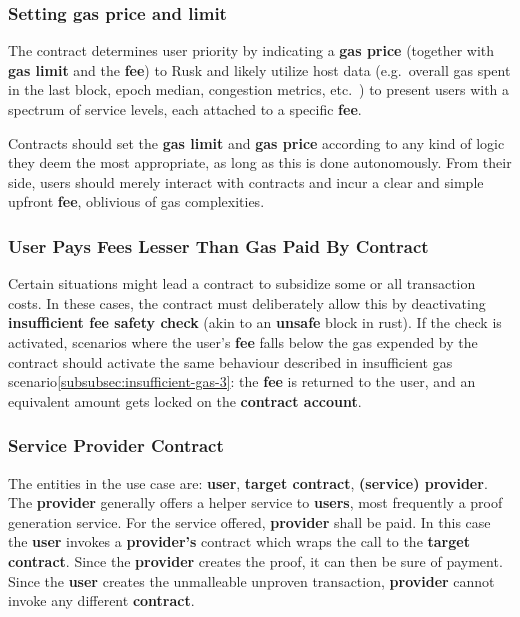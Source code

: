\documentclass[twocolumn, nofootinbib]{revtex4-2}
\begin{document}
    \subsubsection{Setting gas price and limit}\label{subsubsec:setting-gas-price-and-limit}
    The contract determines user priority by indicating a \textbf{gas price}
    (together with \textbf{gas limit} and the \textbf{fee}) to Rusk and likely
    utilize host data (e.g.\ overall gas spent in the last block, epoch median,
    congestion metrics, etc.\ ) to present users with a spectrum of service
    levels, each attached to a specific \textbf{fee}.

    Contracts should set the \textbf{gas limit} and \textbf{gas price} according
    to any kind of logic they deem the most appropriate, as long as this is done
    autonomously.
    From their side, users should merely interact with contracts and incur a
    clear and simple upfront \textbf{fee}, oblivious of gas complexities.

    \subsubsection{User Pays Fees Lesser Than Gas Paid By Contract}\label{subsubsec:user-pays-fees-lesser}
    Certain situations might lead a contract to subsidize some or all
    transaction costs.
    In these cases, the contract must deliberately allow this by deactivating
    \textbf{insufficient fee safety check} (akin to an \textbf{unsafe} block in
    rust).
    If the check is activated, scenarios where the user's \textbf{fee} falls below the
    gas expended by the contract should activate the same behaviour described
    in insufficient gas scenario\ref{subsubsec:insufficient-gas-3}: the
    \textbf{fee} is returned to the user, and an equivalent amount gets locked
    on the \textbf{contract account}.

    \subsubsection{Service Provider Contract}\label{subsubsec:service-provider-contract}
    The entities in the use case are: \textbf{user}, \textbf{target contract},
    \textbf{(service) provider}.
    The \textbf{provider} generally offers a helper service to \textbf{users},
    most frequently a proof generation service.
    For the service offered, \textbf{provider} shall be paid.
    In this case the \textbf{user} invokes a \textbf{provider's} contract which
    wraps the call to the \textbf{target contract}.
    Since the \textbf{provider} creates the proof, it can then be sure of
    payment.
    Since the \textbf{user} creates the unmalleable unproven transaction,
    \textbf{provider} cannot invoke any different \textbf{contract}.
\end{document}
